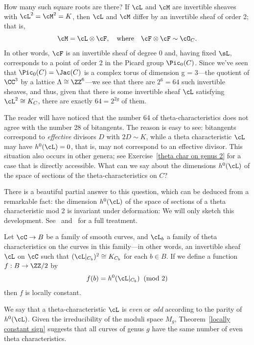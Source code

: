 How many such square roots are there? If $\cL$ and $\cM$ are invertible sheaves with $\cL^2 = \cM^2 = K$, then $\cL$ and $\cM$ differ by an invertible sheaf of order 2; that is,
$$
\cM = \cL \otimes \cF, \quad \text{where} \quad \cF \otimes \cF \sim \cO_C.
$$
In other words, $\cF$ is an invertible sheaf of degree 0 and, having fixed $\sL$,  corresponds to a point of order 2 in the Picard group $\Pic_0(C)$. Since we've seen that $\Pic_0(C) = \Jac(C)$ is a complex torus of dimension g = 3---the quotient of $\CC^3$ by a lattice $\Lambda \cong \ZZ^6$---we see that there are $2^6 = 64$ such invertible sheaves, and thus, given that there is some invertible sheaf $\cL$ satisfying $\cL^2 \cong K_C$, there are exactly $64 = 2^{2g}$ of them.

  
The reader will have noticed that the number 64 of theta-characteristics does not agree with the number 28 of bitangents. The reason is easy to see: bitangents correspond to \emph{effective} divisors $D$ with $2D \sim K$, while a theta characteristic $\cL$ may have $h^0(\cL) = 0$, that is, may not correspond to an effective divisor. 
This situation also occurs in other genera; see Exercise~\ref{theta char on genus 2} for a case that is directly accessible.
What can we say about the dimensions $h^0(\cL)$ of the space of sections of the theta-characteristics on $C$?
 
 There is a beautiful partial answer to this question, which can be deduced from a remarkable fact: the dimension $h^0(\cL)$ of the space of sections of a theta characteristic mod 2 is invariant under deformation:
We will only
sketch this development. See~\cite{MumfordPaper} and~\cite{JHPaper} for a full treatment.

 \begin{theorem}\label{locally constant sign} Let $\cC \to B$ be a family of smooth curves, and $\cL_b$ a family of theta characteristics on the curves in this family---in other words, an invertible sheaf $\cL$ on $\cC$ such that $(\cL|_{C_b})^2 \cong K_{C_b}$ for each $b \in B$. If we define a function $f : B \to \ZZ/2$  by
 $$
 f(b) = h^0(\cL|_{C_b}) \;  \; (\text{mod } 2)
 $$
then $f$ is locally constant.
\end{theorem}

We say that a theta-characteristic $\cL$ is \emph{even} or \emph{odd} according to the parity of $h^0(\cL)$. Given the irreducibility of the moduli space $M_g$,  Theorem~\ref{locally constant sign} suggests that all curves of genus $g$ have the same number of even theta characteristics. 

